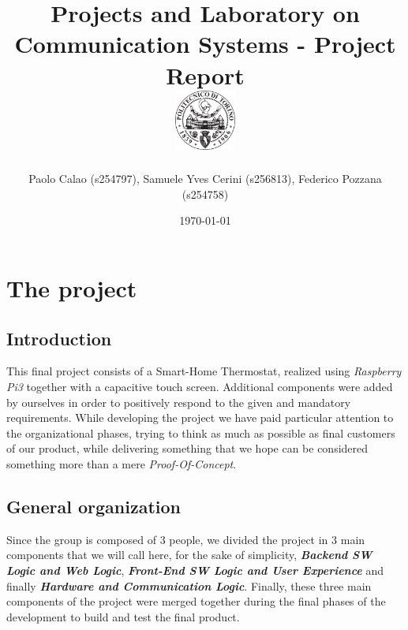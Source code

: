 \documentclass[a4paper]{article}
\begin{document}
    \title{
        Projects and Laboratory on Communication Systems - Project Report \\[0.5cm]
        \includegraphics[width=0.15\textwidth]{PoliLogo.png}%
    }
    \author{Paolo Calao (s254797), Samuele Yves Cerini (s256813), Federico Pozzana (s254758)}

    \date{\today}
    \maketitle
    
    
    \tableofcontents    
    
    \section{The project}

        \subsection{Introduction}
        This final project consists of a Smart-Home Thermostat, realized using \emph{Raspberry Pi3} together with a capacitive touch screen.
        Additional components were added by ourselves in order to positively respond to the given and mandatory requirements.
        While developing the project we have paid particular attention to the organizational phases, trying to think as much as possible as final customers of our product, while delivering something that we hope can be considered something more than a mere \emph{Proof-Of-Concept}.
            
        \subsection{General organization}
        Since the group is composed of 3 people, we divided the project in 3 main components that we will call here, for the sake of simplicity, \textbf{\emph{Backend SW Logic and Web Logic}}, \textbf{\emph{Front-End SW Logic and User Experience}} and finally \textbf{\emph{Hardware and Communication Logic}}.
        Finally, these three main components of the project were merged together during the final phases of the development to build and test the final product.
\end{document}
